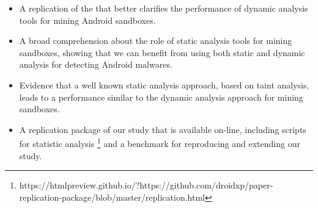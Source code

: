 \begin{itemize}
\item A replication of the \blls that better clarifies the performance of
  dynamic analysis tools for mining Android sandboxes.

\item A broad comprehension about the role of static analysis tools for mining
  sandboxes, showing that we can benefit from using both static and dynamic
  analysis for detecting Android malwares.

\item Evidence that a well known static analysis approach, based on
  taint analysis, leads to a performance similar to the dynamic analysis
  approach for mining sandboxes.

\item A replication package of our study that is available on-line, including
  scripts for statistic analysis \footnote{https://htmlpreview.github.io/?https://github.com/droidxp/paper-replication-package/blob/master/replication.html}
  and a benchmark for reproducing and extending our study.
\end{itemize}




 
 
 
